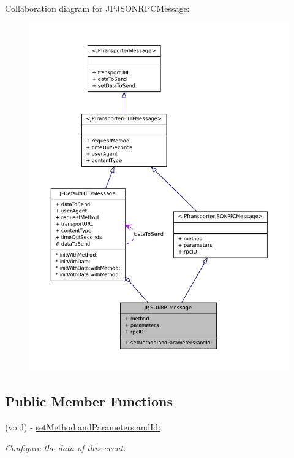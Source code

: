 Collaboration diagram for JPJSONRPCMessage:
\nopagebreak
\begin{figure}[H]
\begin{center}
\leavevmode
\includegraphics[width=400pt]{a00116}
\end{center}
\end{figure}
\subsection*{Public Member Functions}
\begin{DoxyCompactItemize}
\item 
(void) -\/ \hyperlink{a00018_ae4713c3b9ecb66103e48136775629b2b}{setMethod:andParameters:andId:}
\begin{DoxyCompactList}\small\item\em Configure the data of this event. \item\end{DoxyCompactList}\end{DoxyCompactItemize}
